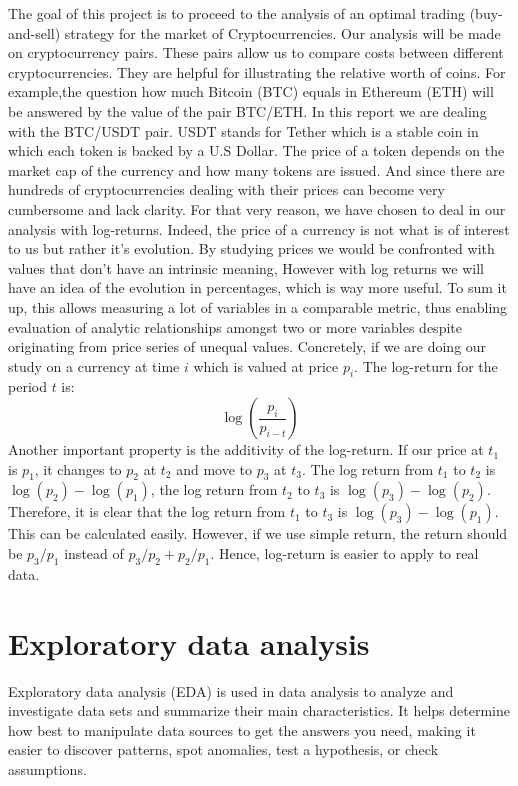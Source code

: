 \documentclass[twoside]{report}
\begin{document}
\begin{spacing}{1}
The goal of this project is to proceed to the analysis of an optimal trading (buy-and-sell) strategy for the market of Cryptocurrencies. Our analysis will be made on cryptocurrency pairs.
These pairs allow us to compare costs between different cryptocurrencies. They are helpful for illustrating the relative worth of coins. For example,the question how much Bitcoin (BTC) equals in Ethereum (ETH) will be answered by the value of the pair BTC/ETH.
In this report we are dealing with the BTC/USDT pair. USDT stands for Tether which is a stable coin in which each token is backed by a U.S Dollar.
The price of a token depends on the market cap of the currency and how many tokens are issued. And since there are hundreds of cryptocurrencies dealing with their prices can become very cumbersome and lack clarity. For that very reason, we have chosen to deal in our analysis with log-returns.
Indeed, the price of a currency is not what is of interest to us but rather it's evolution. By studying prices we would be confronted with values that don't have an intrinsic meaning, However with log returns we will have an idea of the evolution in percentages, which is way more useful. To sum it up, this allows measuring a lot of variables in a comparable metric, thus enabling evaluation of analytic relationships amongst two or more variables despite originating from price series of unequal values. 
Concretely, if we are doing our study on a currency at time $i$ which is valued at price $p_i$. The log-return for the period $t$ is:
\[
\log\left(\frac{p_i}{p_{i-t}}\right)
\]
Another important property is the additivity of the log-return. If our price at $t_1$ is $p_1$, it changes to $p_2$ at $t_2$ and move to $p_3$ at $t_3$. The log return from $t_1 $ to $t_2$ is $\log (p_2) - \log (p_1)$, the log return from $t_2 $ to $t_3$ is $\log (p_3) - \log (p_2)$. Therefore, it is clear that the log return from $t_1 $ to $t_3$ is $\log (p_3) - \log (p_1)$. This can be calculated easily. However, if we use simple return, the return should be $p_3/p_1$ instead of $p_3/p_2 + p_2/p_1$. Hence, log-return is easier to apply to real data.

\section{Exploratory data analysis}
Exploratory data analysis (EDA) is used in data analysis to analyze and investigate data sets and summarize their main characteristics. It helps determine how best to manipulate data sources to get the answers you need, making it easier to discover patterns, spot anomalies, test a hypothesis, or check assumptions.


\end{spacing}
\end{document}
